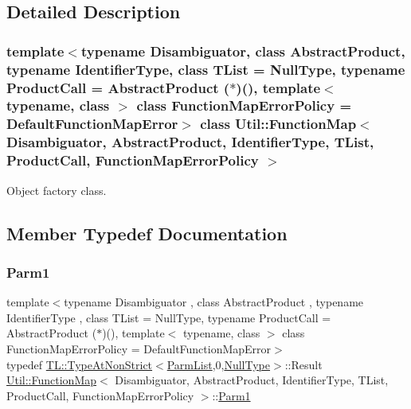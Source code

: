 \subsection{Detailed Description}
\subsubsection*{template$<$typename Disambiguator, class Abstract\+Product, typename Identifier\+Type, class T\+List = Null\+Type, typename Product\+Call = Abstract\+Product ($\ast$)(), template$<$ typename, class $>$ class Function\+Map\+Error\+Policy = Default\+Function\+Map\+Error$>$\newline
class Util\+::\+Function\+Map$<$ Disambiguator, Abstract\+Product, Identifier\+Type, T\+List, Product\+Call, Function\+Map\+Error\+Policy $>$}

Object factory class. 

\subsection{Member Typedef Documentation}
\mbox{\label{classUtil_1_1FunctionMap_a7b842c0101fae8075e8b21c90ede63cb}} 
\subsubsection{\texorpdfstring{Parm1}{Parm1}\hspace{0.1cm}{\footnotesize\ttfamily [1/2]}}
{\footnotesize\ttfamily template$<$typename Disambiguator , class Abstract\+Product , typename Identifier\+Type , class T\+List  = Null\+Type, typename Product\+Call  = Abstract\+Product ($\ast$)(), template$<$ typename, class $>$ class Function\+Map\+Error\+Policy = Default\+Function\+Map\+Error$>$ \\
typedef \mbox{\hyperlink{structUtil_1_1TL_1_1TypeAtNonStrict}{T\+L\+::\+Type\+At\+Non\+Strict}}$<$\mbox{\hyperlink{classUtil_1_1FunctionMap_a6cf0e6766cf6f20642ba61c4994bb477}{Parm\+List}},0,\mbox{\hyperlink{classUtil_1_1NullType}{Null\+Type}}$>$\+::Result \mbox{\hyperlink{classUtil_1_1FunctionMap}{Util\+::\+Function\+Map}}$<$ Disambiguator, Abstract\+Product, Identifier\+Type, T\+List, Product\+Call, Function\+Map\+Error\+Policy $>$\+::\mbox{\hyperlink{classUtil_1_1FunctionMap_a7b842c0101fae8075e8b21c90ede63cb}{Parm1}}}

